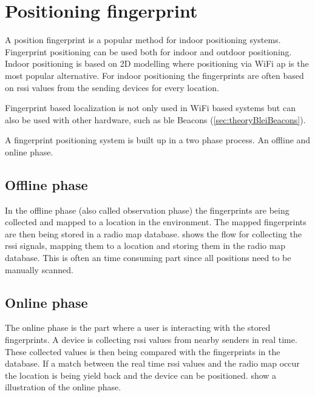 \section{Positioning fingerprint}\label{sec:theoryFingerprint} A position fingerprint is a popular method for indoor positioning systems. 
Fingerprint positioning can be used both for indoor and outdoor positioning.
Indoor positioning is based on 2D modelling where positioning via WiFi \acrlong{ap} is the most popular alternative.
For indoor positioning the fingerprints are often based on \acrshort{rssi} values from the sending devices for every location.
\cite{LocationFingerprintingInfrastructure2004,
IndoorFingerprintPositioning2017}

\bigskip

Fingerprint based localization is not only used in WiFi based systems but can
also be used with other hardware, such as \acrlong{ble} Beacons (\cref{sec:theoryBleiBeacons}).
\cite{PracticalFingerprintingLocalization2017} 

\bigskip

A fingerprint positioning system is built up in a two phase process.  An offline
and online phase.\cite{IndoorFingerprintPositioning2017} 

\subsection{Offline phase}\label{sec:theoryFingerprintOffline} In the offline
phase (also called observation phase) the fingerprints are being collected and
mapped to a location in the environment.
The mapped fingerprints are then being stored in a radio map database.
 shows the flow for collecting the \acrshort{rssi} signals, mapping them to a location and storing them in the radio map database.  This is often an time consuming part since all positions need to be manually
scanned.\cite{IndoorFingerprintPositioning2017} 




\subsection{Online phase}\label{sec:theoryFingerprintOnline} The online phase
is the part where a user is interacting with the stored fingerprints.
A device is collecting \acrshort{rssi} values from nearby senders in real time.
These collected values is then being compared with the fingerprints in the database.
If a match between the real time \acrshort{rssi} values and the radio map occur the location is being yield back and the device can be positioned.
 show a illustration of the
online phase.
\cite{IndoorFingerprintPositioning2017}


